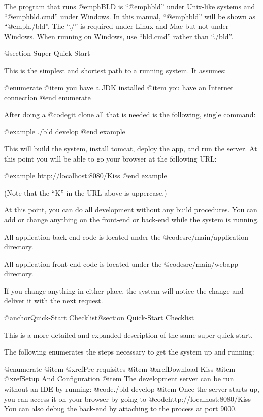 The program that runs @emph{BLD} is ``@emph{bld}'' under Unix-like
systems and ``@emph{bld.cmd}'' under Windows.  In this manual,
``@emph{bld}'' will be shown as ``@emph{./bld}''.  The ``./'' is
required under Linux and Mac but not under Windows.  When running on
Windows, use ``bld.cmd'' rather than ``./bld''.

@section Super-Quick-Start

This is the simplest and shortest path to a running system.  It assumes:

@enumerate
@item
you have a JDK installed
@item
you have an Internet connection
@end enumerate

After doing a @code{git clone} all that is needed is the following,
single command:

@example
    ./bld  develop
@end example

This will build the system, install tomcat, deploy the app, and run
the server.  At this point you will be able to go your browser at the
following URL:

@example
    http://localhost:8080/Kiss
@end example

(Note that the ``K'' in the URL above is uppercase.)

At this point, you can do all development without any build
procedures.  You can add or change anything on the front-end or
back-end while the system is running.

All application back-end code is located under the @code{src/main/application}
directory.

All application front-end code is located under the @code{src/main/webapp}
directory.

If you change anything in either place, the system will notice the change 
and deliver it with the next request.


@anchor{Quick-Start Checklist}@section Quick-Start Checklist

This is a more detailed and expanded description of the same
super-quick-start.

The following enumerates the steps necessary to get the system up and running:

@enumerate
@item
@xref{Pre-requisites}
@item
@xref{Download Kiss}
@item
@xref{Setup And Configuration}
@item
The development server can be run without an IDE by running: @code{./bld develop}
@item
Once the server starts up, you can access it on your browser by going to 
@code{http://localhost:8080/Kiss}  You can also debug the back-end by
attaching to the process at port 9000.

